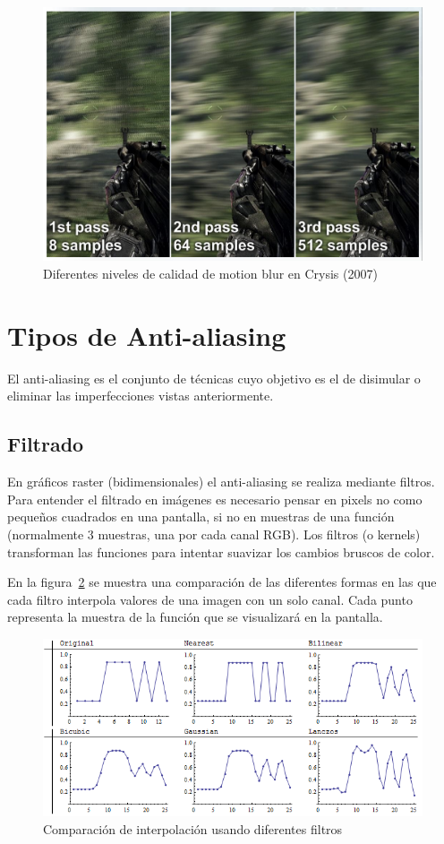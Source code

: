 \documentclass[withindex, glossary]{cam-thesis}
\begin{document}
\begin{figure}[!htbp]
    \includegraphics[width=.8\linewidth]{figures/blurringquality.png}
    \caption{Diferentes niveles de calidad de motion blur en Crysis (2007)\cite{crysis}\label{blurringquality}}
\end{figure}


\section{Tipos de Anti-aliasing}

El anti-aliasing es el conjunto de técnicas cuyo objetivo es el de disimular o eliminar las imperfecciones vistas anteriormente.

\subsection{Filtrado}\label{filtros}

En gráficos raster (bidimensionales) el anti-aliasing se realiza mediante filtros. Para entender el filtrado en imágenes es necesario pensar en pixels no como pequeños cuadrados en una pantalla, si no en muestras de una función (normalmente 3 muestras, una por cada canal RGB)\cite{Smith95apixel}. Los filtros (o kernels) transforman las funciones para intentar suavizar los cambios bruscos de color.

En la figura~\ref{gls} se muestra una comparación de las diferentes formas en las que cada filtro interpola valores de una imagen con un solo canal. Cada punto representa la muestra de la función que se visualizará en la pantalla.


\begin{figure}[!htbp]
    \includegraphics[width=\linewidth]{figures/Lw6ei.png}
    \caption{Comparación de interpolación usando diferentes filtros\cite{gis}\label{gls}}
\end{figure}
\end{document}
